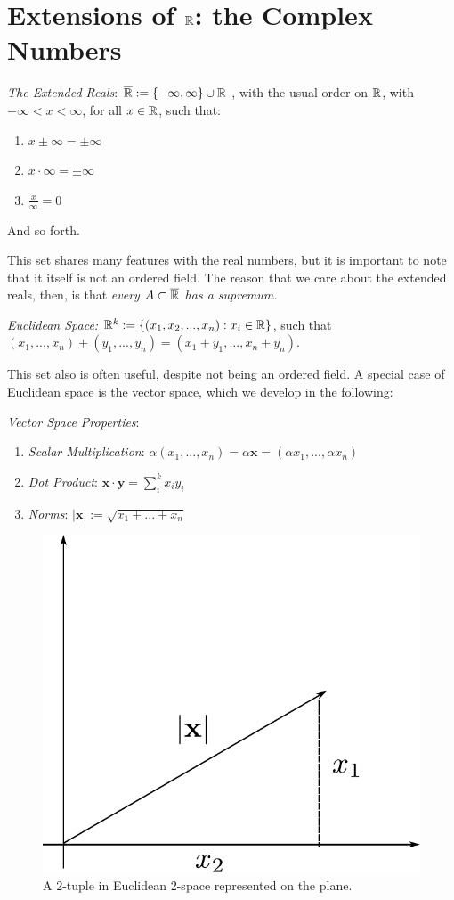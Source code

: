 \section{Extensions of $\mathbb{R}$: the Complex Numbers \C}

\begin{definition}
	\emph{The Extended Reals}: $\overline{\mathbb{R}}:=\{-\infty ,\infty\}\cup \mathbb{R}$ , with the usual order on $\mathbb{R}$, with $-\infty <x<\infty$, for all $x\in\mathbb{R}$, such that: 
    
    \begin{enumerate}
	    \item $x\pm \infty = \pm \infty$
        \item $x\cdot\infty = \pm\infty$
        \item $\frac{x}{\infty}=0$


	\end{enumerate}
    And so forth.
    \end{definition}
    
This set shares many features with the real numbers, but it is important to note that it itself is not an ordered field. The reason that we care about the extended reals, then, is that \emph{every $A\subset \overline{\mathbb{R}}$ has a supremum.}

\begin{definition}
	\emph{Euclidean Space:} $\mathbb{R}^k := \{(x_1,x_2,...,x_n):x_i \in \mathbb{R}\}$, such that $(x_1,...,x_n)+(y_1,...,y_n)=(x_1+y_1,...,x_n+y_n)$.  
\end{definition}

This set also is often useful, despite not being an ordered field. A special case of Euclidean space is the vector space, which we develop in the following:

\begin{definition} \emph{Vector Space Properties}:
	\begin{enumerate}
	    \item \emph{Scalar Multiplication}: $\alpha(x_1,...,x_n)=\alpha\mathbf{x}=(\alpha x_1, ..., \alpha x_n)$
        \item \emph{Dot Product}: $\mathbf{x} \cdot \mathbf{y} = \sum ^k_i x_iy_i$
        \item \emph{Norms}: $|\mathbf{x}|:=\sqrt{x_1 + ... + x_n}$
	\end{enumerate}
  
\end{definition}
\begin{figure}
    \centering
    \includegraphics[width=0.4\linewidth]{figures/norm.pdf}
    \caption{A 2-tuple in Euclidean 2-space represented on the plane.}
    \label{fig:enter-label}
\end{figure}




